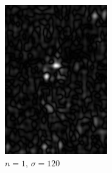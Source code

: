 \documentclass[
	12pt, %
]{style/fphw}
\begin{document}
\begin{figure}[H]
\begin{subfigure}[b]{.22\textwidth}
             \includegraphics[width=\textwidth]{plots2/Q5_3_1_120.png}
             \caption{$n=1$, $\sigma=120$}
             \label{Q5_3_1_120.tif}
         \end{subfigure}
     \vfill
         \begin{subfigure}[b]{.22\textwidth}
             \centering

\end{subfigure}
\end{figure}
\end{document}
